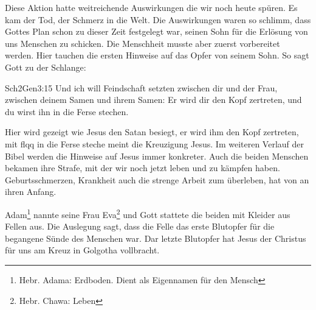 Diese Aktion hatte weitreichende Auswirkungen die wir noch heute spüren. Es kam der Tod, der Schmerz in die Welt. Die Auswirkungen waren so schlimm, dass Gottes Plan schon zu dieser Zeit festgelegt war, seinen Sohn für die Erlösung von uns Menschen zu schicken. Die Menschheit musste aber zuerst vorbereitet werden. Hier tauchen die ersten Hinweise auf das Opfer von seinem Sohn. So sagt Gott zu der Schlange:
\begin{bibeltext}{Sch2}{Gen}{3:15}
	Und ich will Feindschaft setzten zwischen dir und der Frau, zwischen deinem Samen und ihrem Samen: Er wird dir den Kopf zertreten, und du wirst ihn in die Ferse stechen.
\end{bibeltext}
Hier wird gezeigt wie Jesus den Satan besiegt, \flqq er wird ihm den Kopf zertreten, mit flqq in die Ferse steche \frqq{} meint die Kreuzigung Jesus. Im weiteren Verlauf der Bibel werden die Hinweise auf Jesus immer konkreter.
Auch die beiden Menschen bekamen ihre Strafe, mit der wir noch jetzt leben und zu kämpfen haben. Geburtsschmerzen, Krankheit auch die strenge Arbeit zum überleben, hat von an ihren Anfang.

Adam\footnote{Hebr. Adama: Erdboden. Dient als Eigennamen für den Mensch} nannte seine Frau Eva\footnote{Hebr. Chawa: Leben} und Gott stattete die beiden mit Kleider aus Fellen aus. Die Auslegung sagt, dass die Felle das erste Blutopfer für die begangene Sünde des Menschen war. Dar letzte Blutopfer hat Jesus der Christus für uns am Kreuz in Golgotha vollbracht.
